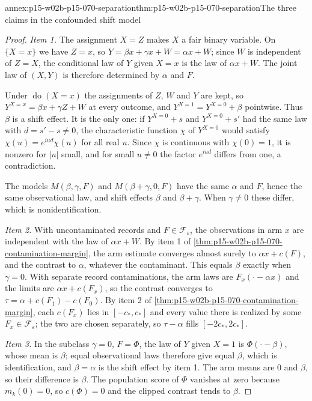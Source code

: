 \begin{annexitem}{annex:p15-w02b-p15-070-separation}{thm:p15-w02b-p15-070-separation}{The three claims in the confounded shift model}
\begin{proof}
\emph{Item 1.} The assignment \(X=Z\) makes \(X\) a fair binary
variable. On \(\{X=x\}\) we have \(Z=x\), so
\(Y=\beta x+\gamma x+W=\alpha x+W\); since \(W\) is independent of
\(Z=X\), the conditional law of \(Y\) given \(X=x\) is the law of
\(\alpha x+W\). The joint law of \((X,Y)\) is therefore determined by
\(\alpha\) and \(F\).

Under \(\operatorname{do}(X=x)\) the assignments of \(Z\), \(W\) and
\(Y\) are kept, so \(Y^{X=x}=\beta x+\gamma Z+W\) at every outcome, and
\(Y^{X=1}=Y^{X=0}+\beta\) pointwise. Thus \(\beta\) is a shift effect.
It is the only one: if \(Y^{X=0}+s\) and \(Y^{X=0}+s'\) had the same law
with \(d=s'-s\ne0\), the characteristic function \(\chi\) of
\(Y^{X=0}\) would satisfy \(\chi(u)=e^{iud}\chi(u)\) for all real
\(u\). Since \(\chi\) is continuous with \(\chi(0)=1\), it is nonzero
for \(|u|\) small, and for small \(u\ne0\) the factor \(e^{iud}\) differs
from one, a contradiction.

The models \(M(\beta,\gamma,F)\) and \(M(\beta+\gamma,0,F)\) have the
same \(\alpha\) and \(F\), hence the same observational law, and shift
effects \(\beta\) and \(\beta+\gamma\). When \(\gamma\ne0\) these
differ, which is nonidentification.

\emph{Item 2.} With uncontaminated records and \(F\in\mathcal
F_\varepsilon\), the observations in arm \(x\) are independent with the
law of \(\alpha x+W\). By item 1 of
\cref{thm:p15-w02b-p15-070-contamination-margin}, the arm estimate
converges almost surely to \(\alpha x+c(F)\), and the contrast to
\(\alpha\), whatever the contaminant. This equals \(\beta\) exactly when
\(\gamma=0\). With separate record contaminations, the arm laws are
\(F_x(\cdot-\alpha x)\) and the limits are \(\alpha x+c(F_x)\), so the
contrast converges to \(\tau=\alpha+c(F_1)-c(F_0)\). By item 2 of
\cref{thm:p15-w02b-p15-070-contamination-margin}, each \(c(F_x)\) lies
in \([-c_*,c_*]\) and every value there is realized by some
\(F_x\in\mathcal F_\varepsilon\); the two are chosen separately, so
\(\tau-\alpha\) fills \([-2c_*,2c_*]\).

\emph{Item 3.} In the subclass \(\gamma=0\), \(F=\Phi\), the law of
\(Y\) given \(X=1\) is \(\Phi(\cdot-\beta)\), whose mean is \(\beta\);
equal observational laws therefore give equal \(\beta\), which is
identification, and \(\beta=\alpha\) is the shift effect by item 1. The
arm means are \(0\) and \(\beta\), so their difference is \(\beta\). The
population score of \(\Phi\) vanishes at zero because \(m_k(0)=0\), so
\(c(\Phi)=0\) and the clipped contrast tends to \(\beta\).


\end{proof}
\end{annexitem}
